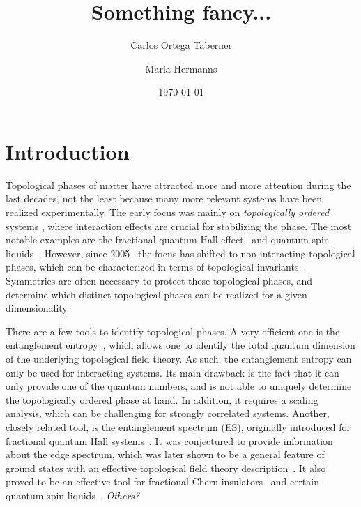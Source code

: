 \documentclass[twocolumn,amsmath,longbibliography,amssymb,superscriptaddress]{revtex4-1}
\newcommand{\mariac}[1]{{\it\color{cyan}#1}}
\begin{document}
		
\title{Something fancy...}
\author{Carlos Ortega Taberner}

\author{Maria Hermanns}
\date{\today}
		
\maketitle
	


\section{Introduction}
Topological phases of matter have attracted more and more attention during the last decades, not the least because many more relevant systems have been realized experimentally. 
The early focus was mainly on \emph{topologically ordered} systems \cite{wenbook}, where interaction effects are crucial for stabilizing the phase. 
The most notable examples are the fractional quantum Hall effect~\cite{Tsui1982} and quantum spin liquids~\cite{Balents2010spin}. 
However, since 2005~\cite{kane2005quantum, roy2009topological} the focus has shifted to non-interacting topological phases, which can be characterized in terms of topological invariants~\cite{ryu2010topological}. 
Symmetries are often necessary to protect these topological phases, and determine which distinct topological phases can be realized for a given dimensionality. 

There are a few tools to identify topological phases. 
A very efficient one is the entanglement entropy~\cite{Kitaev2006topological, Levin2006detecting}, which allows one to identify the total quantum dimension of the underlying topological field theory. 
As such, the entanglement entropy can only be used for interacting systems. 
Its main drawback is the fact that it can only provide one of the quantum numbers, and is not able to uniquely determine the topologically ordered phase at hand. 
In addition, it requires a scaling analysis, which can be challenging for strongly correlated systems. 
Another, closely related tool, is the entanglement spectrum (ES), originally introduced for fractional quantum Hall systems~\cite{Li2008entanglement}. 
It was conjectured to provide information about the edge spectrum, which was later shown to be a general feature of ground states with an effective topological field theory description~\cite{Qi2012general}. 
It also proved to be an effective tool for fractional Chern insulators~\cite{Regnault2011fractional} and certain quantum spin liquids~\cite{yao2010entanglement}. \mariac{Others?}
\end{document}

